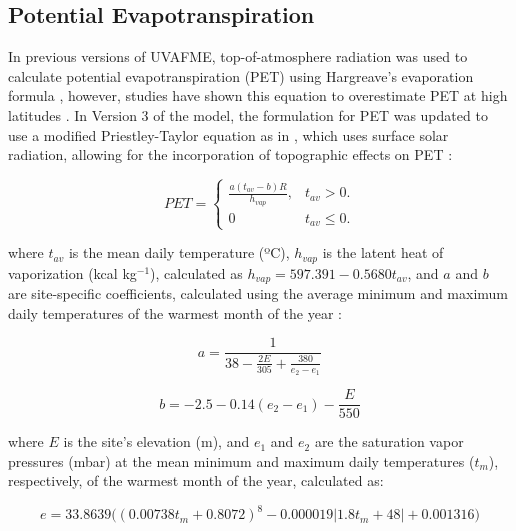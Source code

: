 \documentclass[a4paper, 12pt] {report}
\begin{document}
\subsection{Potential Evapotranspiration} \label{pet}
In previous versions of UVAFME, top-of-atmosphere radiation was used to calculate potential evapotranspiration (PET) using Hargreave's evaporation formula \cite{fosterValidationApplicationForest2017}, however, studies have shown this equation to overestimate PET at high latitudes . In Version 3 of the model, the formulation for PET was updated to use a modified Priestley-Taylor equation as in , which uses surface solar radiation, allowing for the incorporation of topographic effects on PET \cite{campbellIntroductionEnvironmentalBiophysics1977}:

\begin{equation}
PET=\begin{cases}
	\frac{a(t_{av} - b)R}{h_{vap}}, & \text{$t_{av} > 0$}.\\
	0 & \text{$t_{av} \leq 0$}.
  \end{cases}
\end{equation}

where $t_{av}$ is the mean daily temperature (ºC), $h_{vap}$ is the latent heat of vaporization (kcal kg$^{-1}$), calculated as $h_{vap} = 597.391 - 0.5680t_{av}$, and $a$ and $b$ are site-specific coefficients, calculated using the average minimum and maximum daily temperatures of the warmest month of the year \cite{bosenFormulaApproximationSaturation1960}:

\begin{equation}
a = \frac{1}{38 - \frac{2E}{305} + \frac{380}{e_2 - e_1}}
\end{equation}

\begin{equation}
b = -2.5 - 0.14(e_2 - e_1) - \frac{E}{550}
\end{equation}

where $E$ is the site's elevation (m), and $e_1$ and $e_2$ are the saturation vapor pressures (mbar) at the mean minimum and maximum daily temperatures ($t_m$), respectively, of the warmest month of the year, calculated as:

\begin{equation}
e = 33.8639\Big((0.00738t_m + 0.8072)^8 - 0.000019|1.8t_m + 48| + 0.001316\Big)
\end{equation}
\end{document}
